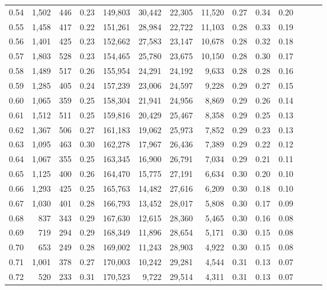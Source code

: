 \begin{tabular}{rrrrrrrrrrrrrr}
0.54 &  1,502 &  446 &  0.23 &  149,803 &   30,442 &  22,305 &  11,520 &  0.27 &  0.34 &      0.20 \\
0.55 &  1,458 &  417 &  0.22 &  151,261 &   28,984 &  22,722 &  11,103 &  0.28 &  0.33 &      0.19 \\
0.56 &  1,401 &  425 &  0.23 &  152,662 &   27,583 &  23,147 &  10,678 &  0.28 &  0.32 &      0.18 \\
0.57 &  1,803 &  528 &  0.23 &  154,465 &   25,780 &  23,675 &  10,150 &  0.28 &  0.30 &      0.17 \\
0.58 &  1,489 &  517 &  0.26 &  155,954 &   24,291 &  24,192 &   9,633 &  0.28 &  0.28 &      0.16 \\
0.59 &  1,285 &  405 &  0.24 &  157,239 &   23,006 &  24,597 &   9,228 &  0.29 &  0.27 &      0.15 \\
0.60 &  1,065 &  359 &  0.25 &  158,304 &   21,941 &  24,956 &   8,869 &  0.29 &  0.26 &      0.14 \\
0.61 &  1,512 &  511 &  0.25 &  159,816 &   20,429 &  25,467 &   8,358 &  0.29 &  0.25 &      0.13 \\
0.62 &  1,367 &  506 &  0.27 &  161,183 &   19,062 &  25,973 &   7,852 &  0.29 &  0.23 &      0.13 \\
0.63 &  1,095 &  463 &  0.30 &  162,278 &   17,967 &  26,436 &   7,389 &  0.29 &  0.22 &      0.12 \\
0.64 &  1,067 &  355 &  0.25 &  163,345 &   16,900 &  26,791 &   7,034 &  0.29 &  0.21 &      0.11 \\
0.65 &  1,125 &  400 &  0.26 &  164,470 &   15,775 &  27,191 &   6,634 &  0.30 &  0.20 &      0.10 \\
0.66 &  1,293 &  425 &  0.25 &  165,763 &   14,482 &  27,616 &   6,209 &  0.30 &  0.18 &      0.10 \\
0.67 &  1,030 &  401 &  0.28 &  166,793 &   13,452 &  28,017 &   5,808 &  0.30 &  0.17 &      0.09 \\
0.68 &    837 &  343 &  0.29 &  167,630 &   12,615 &  28,360 &   5,465 &  0.30 &  0.16 &      0.08 \\
0.69 &    719 &  294 &  0.29 &  168,349 &   11,896 &  28,654 &   5,171 &  0.30 &  0.15 &      0.08 \\
0.70 &    653 &  249 &  0.28 &  169,002 &   11,243 &  28,903 &   4,922 &  0.30 &  0.15 &      0.08 \\
0.71 &  1,001 &  378 &  0.27 &  170,003 &   10,242 &  29,281 &   4,544 &  0.31 &  0.13 &      0.07 \\
0.72 &    520 &  233 &  0.31 &  170,523 &    9,722 &  29,514 &   4,311 &  0.31 &  0.13 &      0.07 \\

\end{tabular}
